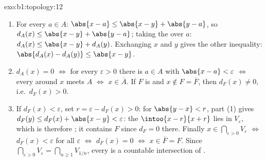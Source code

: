 \begin{solution}{exo:b1:topology:12}
\begin{enumerate}
  \item For every $a \in A$: $\abs{x - a} \leq \abs{x - y} +
        \abs{y - a}$, so $d_A(x) \leq \abs{x - y} + \abs{y - a}$;
        taking the  over $a$: $d_A(x) \leq \abs{x - y} +
        d_A(y)$. Exchanging $x$ and $y$ gives the other
        inequality: $\abs{d_A(x) - d_A(y)} \leq \abs{x - y}$.
  \item $d_A(x) = 0$ $\iff$ for every $\varepsilon > 0$ there is
        $a \in A$ with $\abs{x - a} < \varepsilon$ $\iff$ every
         around $x$ meets $A$ $\iff$ $x \in \overline A$.
        If $F$ is  and $x \notin F = \overline F$, then
        $d_F(x) \neq 0$, i.e.\ $d_F(x) > 0$.
  \item If $d_F(x) < \varepsilon$, set $r = \varepsilon -
        d_F(x) > 0$: for $\abs{y - x} < r$, part (1) gives
        $d_F(y) \leq d_F(x) + \abs{x - y} < \varepsilon$: the
         $\intoo{x - r}{x + r}$ lies in $V_\varepsilon$,
        which is therefore ; it contains $F$ since $d_F = 0$
        there. Finally $x \in \bigcap_{\varepsilon>0}
        V_\varepsilon$ $\iff$ $d_F(x) < \varepsilon$ for all
        $\varepsilon$ $\iff$ $d_F(x) = 0$ $\iff$ $x \in \overline
        F = F$. Since $\bigcap_{\varepsilon > 0} V_\varepsilon =
        \bigcap_{n \geq 1} V_{1/n}$, every  is a
        countable intersection of .
\end{enumerate}
\end{solution}

